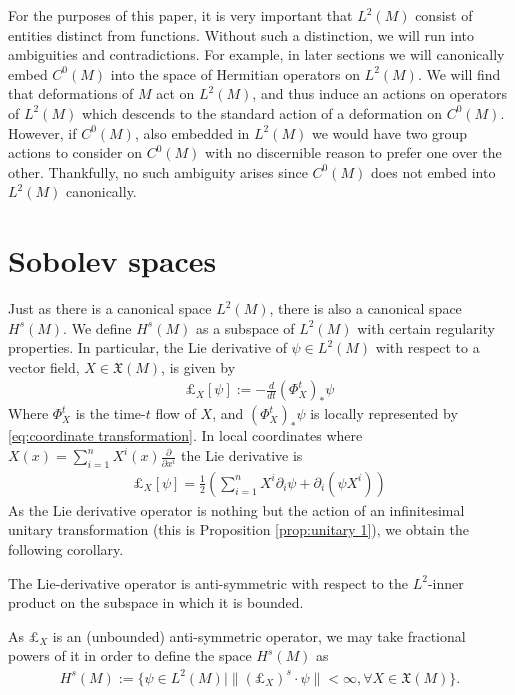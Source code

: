 \documentclass[final,leqno]{siamart}
\begin{document}
For the purposes of this paper, it is very important that $L^2(M)$ consist of entities distinct from functions.
Without such a distinction, we will run into ambiguities and contradictions.
For example, in later sections we will canonically embed $C^0(M)$ into the space of Hermitian operators on $L^2(M)$.
We will find that deformations of $M$ act on $L^2(M)$, and thus induce an actions on operators of $L^2(M)$ which descends to the standard action of a deformation on $C^0(M)$.
However, if $C^0(M)$, also embedded in $L^2(M)$ we would have two group actions to consider on $C^0(M)$ with no discernible reason to prefer one over the other.
Thankfully, no such ambiguity arises since $C^0(M)$ does not embed into $L^2(M)$ canonically.

\section{Sobolev spaces}
Just as there is a canonical space $L^2(M)$, there is also a canonical space $H^s(M)$.
We define $H^s(M)$ as a subspace of $L^2(M)$ with certain regularity properties.
In particular, the Lie derivative of $\psi \in L^2(M)$ with respect to a vector field, $X \in \mathfrak{X}(M)$, is given by
\begin{align*}
	\pounds_X[ \psi] := - \frac{d}{dt} ( \Phi^{t}_X )_*\psi
\end{align*}
Where $\Phi^t_X$ is the time-$t$ flow of $X$, and $( \Phi^{t}_X )_*\psi$ is locally represented by \eqref{eq:coordinate transformation}.
In local coordinates where $X(x) = \sum_{i=1}^{n} X^i(x) \frac{ \partial}{ \partial x^i}$ the Lie derivative is
\begin{align}
	\pounds_X [\psi] = \frac{1}{2} \left( \sum_{i=1}^{n} X^i \partial_i \psi + \partial_i (\psi X^i) \right) \label{eq:representation}
\end{align}
As the Lie derivative operator is nothing but the action of an infinitesimal unitary transformation (this is Proposition \ref{prop:unitary 1}), we obtain the following corollary.
\begin{corollary}
	The Lie-derivative operator is anti-symmetric with respect to the  $L^2$-inner product on the subspace in which it is bounded.
\end{corollary}
As $\pounds_X$ is an (unbounded) anti-symmetric operator, we may take fractional powers of it in order to define the space $H^s(M)$ as
\begin{align*}
	H^s(M) := \{ \psi \in L^2(M) \mid \| (\pounds_X)^{s} \cdot \psi \| < \infty, \forall X \in \mathfrak{X}(M) \}.
\end{align*}
\end{document}

